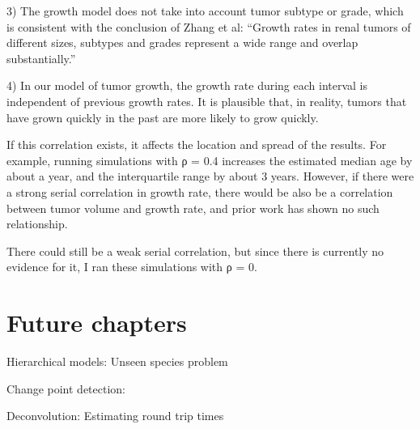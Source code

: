 \documentclass[12pt]{book}
\begin{document}
3) The growth model does not take into account tumor subtype or grade, which is consistent with the conclusion of Zhang et al: “Growth rates in renal tumors of different sizes, subtypes and grades represent a wide range and overlap substantially.”  

4) In our model of tumor growth, the growth rate during each interval is independent of previous growth rates.  It is plausible that, in reality, tumors that have grown quickly in the past are more likely to grow quickly.

If this correlation exists, it affects the location and spread of the results.  For example, running simulations with ρ = 0.4 increases the estimated median age by about a year, and the interquartile range
by about 3 years.  However, if there were a strong serial correlation in growth rate, there would be also be a correlation between tumor volume and growth rate, and prior work has shown no such relationship.

There could still be a weak serial correlation, but since there is currently no evidence for it, I ran these simulations with ρ  = 0.


\chapter{Future chapters}

Hierarchical models: Unseen species problem

Change point detection: 

Deconvolution: Estimating round trip times
\end{document}
